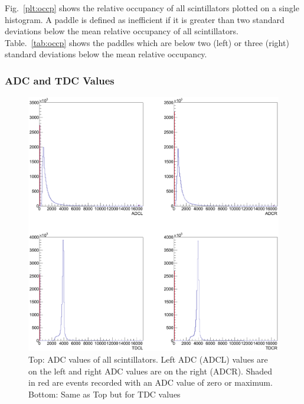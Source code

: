 Fig.~\ref{plt:occp} shows the relative occupancy of all scintillators plotted on a single histogram. A paddle is defined as inefficient if it is greater than two standard deviations below the mean relative occupancy of all scintillators. Table.~\ref{tab:occp} shows the paddles which are below two (left) or three (right) standard deviations below the mean relative occupancy.


\subsubsection{\label{sec:calib.tof.adctdc}ADC and TDC Values}

\begin{figure}\begin{center}
    \includegraphics[width=0.70\linewidth]{figures/calib/tof/tofko/adctdcval.eps}
    \caption{\label{plt:adctdcval}Top: ADC values of all scintillators. Left ADC (ADCL) values are on the left and right ADC values are on the right (ADCR). Shaded in red are events recorded with an ADC value of zero or maximum. Bottom: Same as Top but for TDC values}
\end{center}\end{figure}

